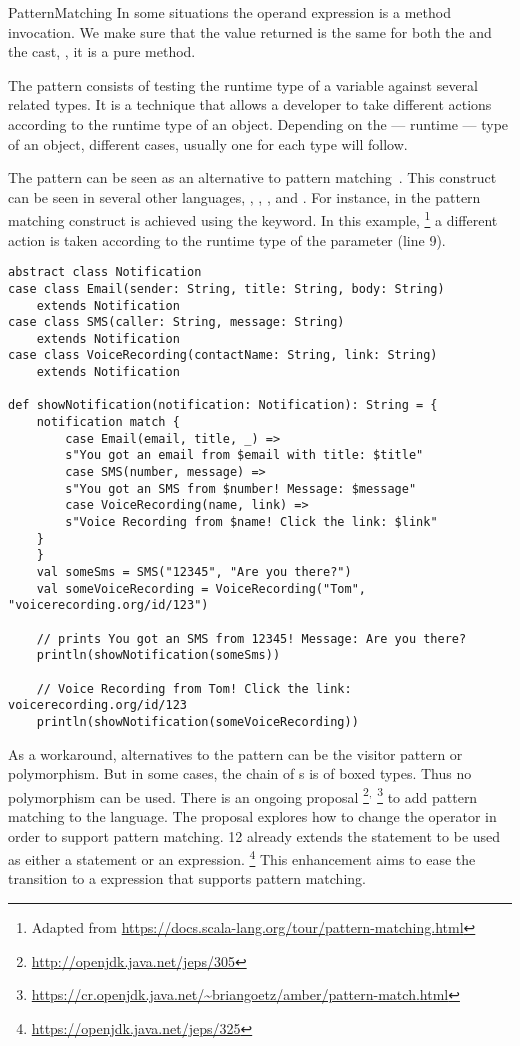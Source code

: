 \begin{pattern}{PatternMatching}
In some situations the operand expression is a method invocation.
%
%
We make sure that the value returned is the same for both the  and the cast, \ie, it is a pure method.

\discussion{}
The \thisp{} pattern consists of testing the runtime type of a variable against several related types.
It is a technique that allows a developer to take different actions according to the runtime type of an object.
Depending on the --- runtime --- type of an object, different cases, usually one for each type will follow.

The \thisp{} pattern can be seen as an \adhoc{} alternative to pattern matching~\citep{lavilleLazyPatternMatching1987}.
This construct can be seen in several other languages, \eg, \scala{}, \csharp{}, and \haskell{}.
For instance, in \scala{} the pattern matching construct is achieved using the  keyword.
In this example,%
\footnote{Adapted from \url{https://docs.scala-lang.org/tour/pattern-matching.html}}
a different action is taken according to the runtime type of the parameter  (line 9).

\begin{verbatim}
abstract class Notification
case class Email(sender: String, title: String, body: String)
	extends Notification
case class SMS(caller: String, message: String)
	extends Notification
case class VoiceRecording(contactName: String, link: String)
	extends Notification

def showNotification(notification: Notification): String = {
	notification match {
		case Email(email, title, _) =>
		s"You got an email from $email with title: $title"
		case SMS(number, message) =>
		s"You got an SMS from $number! Message: $message"
		case VoiceRecording(name, link) =>
		s"Voice Recording from $name! Click the link: $link"
	}
	}
	val someSms = SMS("12345", "Are you there?")
	val someVoiceRecording = VoiceRecording("Tom", "voicerecording.org/id/123")
	
	// prints You got an SMS from 12345! Message: Are you there?
	println(showNotification(someSms))
	
	// Voice Recording from Tom! Click the link: voicerecording.org/id/123	
	println(showNotification(someVoiceRecording))
\end{verbatim}

As a workaround, alternatives to the \thisp{} pattern can be the visitor pattern or polymorphism.
But in some cases, the chain of s is of boxed types.
Thus no polymorphism can be used.
There is an ongoing proposal%
\footnote{\url{http://openjdk.java.net/jeps/305}}$^{,}$%
\footnote{\url{https://cr.openjdk.java.net/~briangoetz/amber/pattern-match.html}}
to add pattern matching to the \java{} language.
The proposal explores how to change the  operator in order to support pattern matching.
%
%
\java{} 12 already extends the  statement to be used as either a statement or an expression.%
\footnote{\url{https://openjdk.java.net/jeps/325}}
This enhancement aims to ease the transition to a  expression that supports pattern matching.


\end{pattern}
